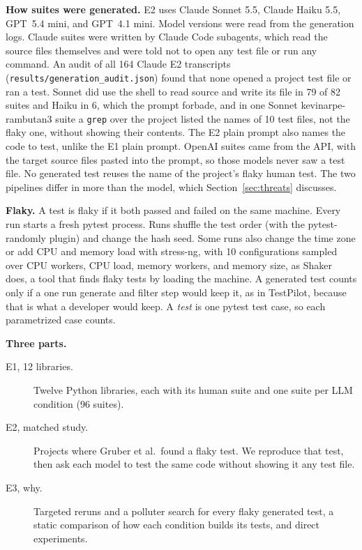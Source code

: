 \documentclass[sigconf,nonacm]{acmart}
\begin{document}
\textbf{How suites were generated.} E2 uses Claude Sonnet 5.5, Claude Haiku 5.5, GPT~5.4 mini, and GPT~4.1 mini. Model versions were read from the generation logs. Claude suites were written by Claude Code subagents, which read the source files themselves and were told not to open any test file or run any command. An audit of all 164 Claude E2 transcripts (\texttt{results/generation\_audit.json}) found that none opened a project test file or ran a test. Sonnet did use the shell to read source and write its file in 79 of 82 suites and Haiku in 6, which the prompt forbade, and in one Sonnet kevinarpe-rambutan3 suite a \texttt{grep} over the project listed the names of 10 test files, not the flaky one, without showing their contents. The E2 plain prompt also names the code to test, unlike the E1 plain prompt. OpenAI suites came from the API, with the target source files pasted into the prompt, so those models never saw a test file. No generated test reuses the name of the project's flaky human test. The two pipelines differ in more than the model, which Section~\ref{sec:threats} discusses.

\textbf{Flaky.} A test is flaky if it both passed and failed on the same machine. Every run starts a fresh pytest process. Runs shuffle the test order (with the pytest-randomly plugin) and change the hash seed. Some runs also change the time zone or add CPU and memory load with stress-ng, with 10 configurations sampled over CPU workers, CPU load, memory workers, and memory size, as Shaker~\cite{silva2020} does, a tool that finds flaky tests by loading the machine. A generated test counts only if a one run generate and filter step would keep it, as in TestPilot, because that is what a developer would keep. A \emph{test} is one pytest test case, so each parametrized case counts.

\textbf{Three parts.}
\begin{description}
\item[E1, 12 libraries.] Twelve Python libraries, each with its human suite and one suite per LLM condition (96 suites).
\item[E2, matched study.] Projects where Gruber et al.\ found a flaky test. We reproduce that test, then ask each model to test the same code without showing it any test file.
\item[E3, why.] Targeted reruns and a polluter search for every flaky generated test, a static comparison of how each condition builds its tests, and direct experiments.
\end{description}
\end{document}
